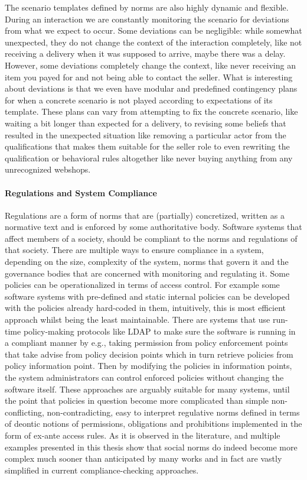 The scenario templates defined by norms are also highly dynamic and flexible. During an interaction we are constantly monitoring the scenario for deviations from what we expect to occur. Some deviations can be negligible: while somewhat unexpected, they do not change the context of the interaction completely, like not receiving a delivery when it was supposed to arrive, maybe there was a delay. However, some deviations completely change the context, like never receiving an item you payed for and not being able to contact the seller. What is interesting about deviations is that we even have modular and predefined contingency plans for when a concrete scenario is not played according to expectations of its template. These plans can vary from attempting to fix the concrete scenario, like waiting a bit longer than expected for a delivery, to revising some beliefs that resulted in the unexpected situation like removing a particular actor from the qualifications that makes them suitable for the seller role to even rewriting the qualification or behavioral rules altogether like never buying anything from any unrecognized webshops.


\paragraph{Regulations and System Compliance}
Regulations are a form of norms that are (partially) concretized, written as a normative text and is enforced by some authoritative body.  Software systems that affect members of a society, should be compliant to the norms and regulations of that society. There are multiple ways to ensure compliance in a system, depending on the size, complexity of the system, norms that govern it and the governance bodies that are concerned with monitoring and regulating it. Some policies can be operationalized in terms of access control. For example some software systems with pre-defined and static internal policies can be developed with the policies already hard-coded in them, intuitively, this is most efficient approach whilst being the least maintainable. There are systems that use run-time policy-making protocols like LDAP to make sure the software is running in a compliant manner by e.g., taking permission from policy enforcement points that take advise from policy decision points which in turn retrieve policies from policy information point. Then by modifying the policies in information points, the system administrators can control enforced policies without changing the software itself. These approaches are arguably suitable for many systems, until the point that policies in question become more complicated than simple non-conflicting, non-contradicting, easy to interpret regulative norms defined in terms of deontic notions of permissions, obligations and prohibitions implemented in the form of ex-ante access rules. As it is observed in the literature, and multiple examples presented in this thesis show that social norms do indeed become more complex much sooner than anticipated by many works and in fact are vastly simplified in current compliance-checking approaches. 



